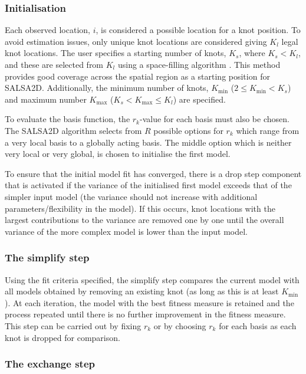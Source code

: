 \documentclass[letterpaper, 12pt]{interact}
\begin{document}
	
	\subsubsection*{Initialisation}\label{initialisation}
	
	Each observed location, \(i\), is considered a possible location for a knot position. To avoid estimation issues, only unique knot locations are considered giving \(K_l\) legal knot locations. The user specifies a starting number of knots, \(K_s\), where \(K_s<K_l\), and these are selected from \(K_l\) using a space-filling algorithm \cite{Johnson1990}. This method provides good coverage across the spatial region as a starting position for SALSA2D. Additionally, the minimum number of knots, \(K_{\textrm{min}}\) (\(2\leq K_{\textrm{min}}<K_s\)) and maximum number \(K_{\textrm{max}}\) (\(K_s< K_{\textrm{max}}\leq K_l\)) are specified.
	
	To evaluate the basis function, the \(r_k\)-value for each basis must also be chosen. The SALSA2D algorithm selects from \(R\) possible options for \(r_k\) which range from a very local basis to a globally acting basis. The middle option which is neither very local or very global, is chosen to initialise the first model.
	
	To ensure that the initial model fit has converged, there is a drop step component that is activated if the variance of the initialised first model exceeds that of the simpler input model (the variance should not increase with additional parameters/flexibility in the model). If this occurs, knot locations with the largest contributions to the variance are removed one by one until the overall variance of the more complex model is lower than the input model.  
	
	
	\subsubsection*{The simplify step}\label{the-simplify-step}
	
	Using the fit criteria specified, the simplify step compares the current model with all models obtained by removing an existing knot (as long as this is at least \(K_{\textrm{min}}\)). At each iteration, the model with the best fitness measure is retained and the process repeated until there is no further improvement in the fitness measure. This step can be carried out by fixing \(r_k\) or by choosing \(r_k\) for each basis as each knot is dropped for comparison.
	
	
	\subsubsection*{The exchange step}\label{the-exchange-step}
	
\end{document}
